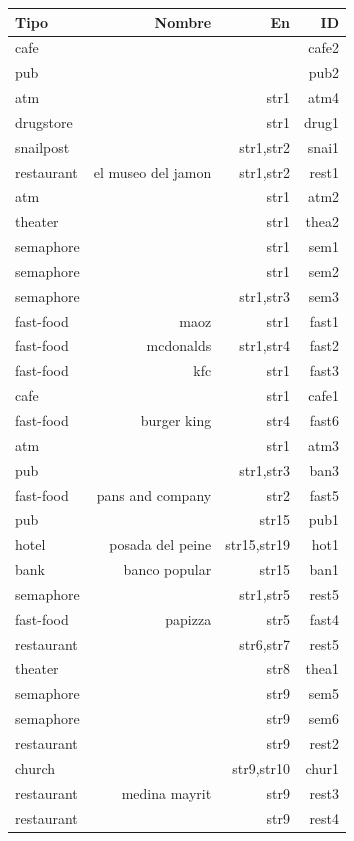 \begin{table}[!t]
\begin{small}
\begin{center}
\begin{tabular}{|l|r|r|r|}
\hline
Tipo & Nombre & En & ID\\
\hline

cafe & & & cafe2 \\
pub	& & & pub2 \\
atm	& & str1 & atm4 \\
drugstore & & str1 & drug1\\
snailpost & & str1,str2 & snai1\\
restaurant & el museo del jamon & str1,str2 & rest1\\
atm	& & str1 & atm2\\
theater & & str1 & thea2\\
semaphore & & str1 & sem1\\
semaphore & & str1 & sem2\\
semaphore & & str1,str3 & sem3\\
fast-food & maoz & str1 & fast1\\
fast-food & mcdonalds & str1,str4 & fast2\\
fast-food & kfc & str1 & fast3\\
cafe & & str1 & cafe1\\
fast-food & burger king & str4 & fast6\\
atm	& & str1 & atm3\\
pub	& & str1,str3 & ban3\\
fast-food & pans and company & str2 & fast5\\
pub	& & str15 & pub1\\
hotel & posada del peine & str15,str19 & hot1\\
bank & banco popular & str15 & ban1\\
semaphore & & str1,str5 & rest5\\
fast-food & papizza & str5 & fast4\\
restaurant	& & str6,str7 & rest5\\
theater	& & str8 & thea1\\
semaphore & & str9 & sem5\\
semaphore & & str9 & sem6\\
restaurant & & str9 & rest2\\
church	& & str9,str10 & chur1\\
restaurant & medina mayrit & str9 & rest3\\
restaurant & & str9 & rest4\\

\end{tabular}
\end{center}
\end{small}
\end{table}
